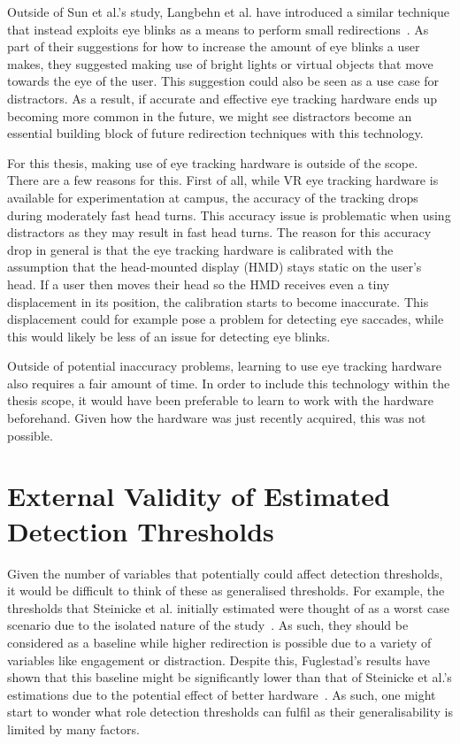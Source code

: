 Outside of Sun et al.'s study, Langbehn et al. have introduced a similar technique that instead exploits eye blinks as a means to perform small redirections~\cite{langbehn2018blink}. As part of their suggestions for how to increase the amount of eye blinks a user makes, they suggested making use of bright lights or virtual objects that move towards the eye of the user. This suggestion could also be seen as a use case for distractors. As a result, if accurate and effective eye tracking hardware ends up becoming more common in the future, we might see distractors become an essential building block of future redirection techniques with this technology. 

For this thesis, making use of eye tracking hardware is outside of the scope. There are a few reasons for this. First of all, while VR eye tracking hardware is available for experimentation at campus, the accuracy of the tracking drops during moderately fast head turns. This accuracy issue is problematic when using distractors as they may result in fast head turns. The reason for this accuracy drop in general is that the eye tracking hardware is calibrated with the assumption that the head-mounted display (HMD) stays static on the user's head. If a user then moves their head so the HMD receives even a tiny displacement in its position, the calibration starts to become inaccurate. This displacement could for example pose a problem for detecting eye saccades, while this would likely be less of an issue for detecting eye blinks. 

Outside of potential inaccuracy problems, learning to use eye tracking hardware also requires a fair amount of time. In order to include this technology within the thesis scope, it would have been preferable to learn to work with the hardware beforehand. Given how the hardware was just recently acquired, this was not possible.

\section{External Validity of Estimated Detection Thresholds}
Given the number of variables that potentially could affect detection thresholds, it would be difficult to think of these as generalised thresholds. For example, the thresholds that Steinicke et al. initially estimated were thought of as a worst case scenario due to the isolated nature of the study~\cite{5072212}. As such, they should be considered as a baseline while higher redirection is possible due to a variety of variables like engagement or distraction. Despite this, Fuglestad's results have shown that this baseline might be significantly lower than that of Steinicke et al.'s estimations due to the potential effect of better hardware~\cite{fuglestad2018redirected}. As such, one might start to wonder what role detection thresholds can fulfil as their generalisability is limited by many factors.  


